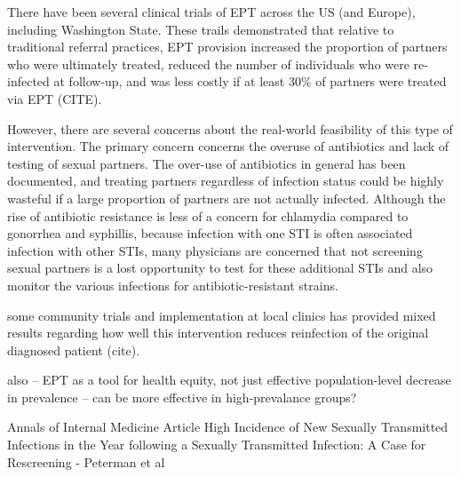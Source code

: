 \documentclass [11pt, proquest] {uwthesis}[2015/03/03]
\begin{document}
There have been several clinical trials of EPT across the US (and Europe), including Washington State. These trails demonstrated that relative to traditional referral practices, EPT provision increased the proportion of partners who were ultimately treated, reduced the number of individuals who were re-infected at follow-up, and was less costly if at least 30\% of partners were treated via EPT (CITE).

However, there are several concerns about the real-world feasibility of this type of intervention. The primary concern concerns the overuse of antibiotics and lack of testing of sexual partners. The over-use of antibiotics in general has been documented, and treating partners regardless of infection status could be highly wasteful if a large proportion of partners are not actually infected. Although the rise of antibiotic resistance is less of a concern for chlamydia compared to gonorrhea and syphillis, because infection with one STI is often associated infection with other STIs, many physicians are concerned that not screening sexual partners is a lost opportunity to test for these additional STIs and also monitor the various infections for antibiotic-resistant strains.

some community trials and implementation at local clinics has provided mixed results regarding how well this intervention reduces reinfection of the original diagnosed patient (cite).

also -- EPT as a tool for health equity, not just effective population-level decrease in prevalence -- can be more effective in high-prevalance groups?

Annals of Internal Medicine Article High Incidence of New Sexually Transmitted Infections in the Year
following a Sexually Transmitted Infection: A Case for Rescreening - Peterman et al
\end{document}
